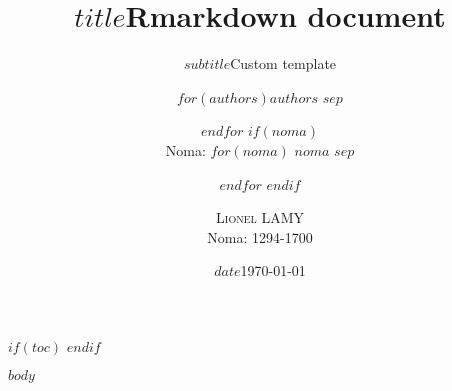 \documentclass[a4paper, 12pt]{article}
\title{$title$}
\title{Rmarkdown document}
\subtitle{$subtitle$}
\subtitle{Custom template}
\author{$for(authors)$\textsc{$authors$} $sep$ \and $endfor$ $if(noma)$ \\ Noma: $for(noma)$ $noma$ $sep$ \and $endfor$ $endif$}
\author{\textsc{Lionel LAMY} \\ Noma: 1294-1700}
\institute{$institute$}
\institute{Université catholique de Louvain}
\date{$date$}
\date{\today}
\begin{document}
    \maketitle
    $if(toc)$
    {
     \setcounter{tocdepth}{$toc-depth$}
     \romantableofcontents
    }
    $endif$


    $body$
\end{document}
